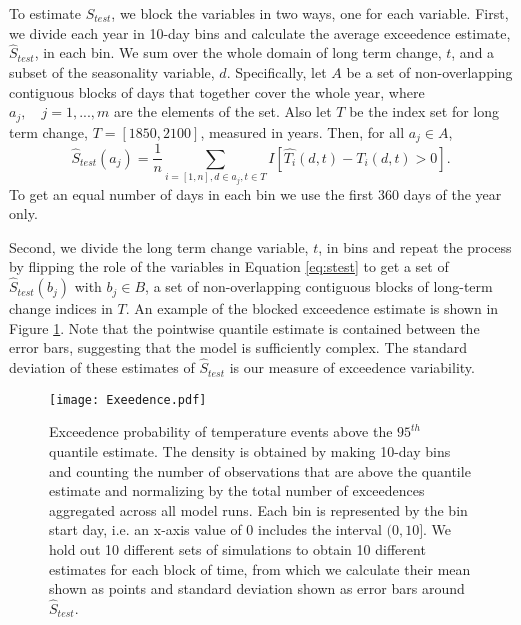 \documentclass{ametsoc}
\newcommand\smallfigwidth{\columnwidth}
\begin{document}
To estimate $S_{test}$, we block the variables in two ways, one for each variable. First, we divide each year in 10-day bins and calculate the average exceedence estimate, $\hat{S}_{test}$, in each bin. We sum over the whole domain of long term change, $t$, and a subset of the seasonality variable, $d$. Specifically, let $A$ be a set of non-overlapping contiguous blocks of days that together cover the whole year, where $a_j, \quad j = 1, ..., m$ are the elements of the set. Also let $T$ be the index set for long term change, $T = [1850,2100]$, measured in years. Then, for all  $a_j \in A$,
\begin{equation}
\label{eq:stest}
\hat{S}_{test}(a_j) = \frac{1}{n}\sum_{i=[1,n], d\in a_j, t \in T} I\left[\hat{T_i}(d,t) - T_i(d,t) > 0\right].
\end{equation}
To get an equal number of days in each bin we use the first 360 days of the year only.

 Second, we divide the long term change variable, $t$, in bins and repeat the process by flipping the role of the variables in Equation \ref{eq:stest} to get a set of $\hat{S}_{test}(b_j)$ with $b_j \in B$, a set of non-overlapping contiguous blocks of long-term change indices in $T$. An example of the blocked exceedence estimate is shown in Figure \ref{Exeedence}. Note that the pointwise quantile estimate is contained between the error bars, suggesting that the model is sufficiently complex. The standard deviation of these estimates of $\hat{S}_{test}$ is our measure of exceedence variability. 


\begin{figure}[ht]
\centerline{\texttt{[image: Exeedence.pdf]}}
\caption{\small{Exceedence probability of temperature events above the $95^{th}$ quantile estimate. The density is obtained by making 10-day bins and counting the number of observations that are above the quantile estimate and normalizing by the total number of exceedences aggregated across all model runs. Each bin is represented by the bin start day, i.e. an x-axis value of 0 includes the interval $(0,10]$. We hold out 10 different sets of simulations to obtain 10 different estimates for each block of time, from which we calculate their mean shown as points and standard deviation shown as error bars around $\hat{S}_{test}$.}}
\label{Exeedence}
\end{figure}
\end{document}
